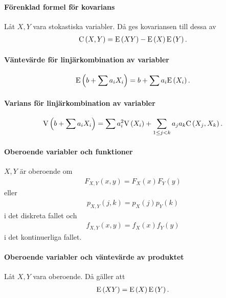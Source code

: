 \proof

\paragraph{Förenklad formel för kovarians}
Låt $X, Y$ vara stokastiska variabler. Då ges kovariansen till dessa av
\begin{align*}
	\text{C}\left(X, Y\right) = \text{E}\left(XY\right) - \text{E}\left(X\right)\text{E}\left(Y\right).
\end{align*}

\proof

\paragraph{Väntevärde för linjärkombination av variabler}
\begin{align*}
	\text{E}\left(b + \sum a_iX_i\right) = b +\sum a_i\text{E}\left(X_i\right).
\end{align*}

\proof

\paragraph{Varians för linjärkombination av variabler}
\begin{align*}
	\text{V}\left(b + \sum a_iX_i\right) = \sum a_i^2\text{V}\left(X_i\right) + \sum\limits_{1\leq j < k}a_ja_k\text{C}\left(X_j, X_k\right).
\end{align*}

\proof

\paragraph{Oberoende variabler och funktioner}
$X, Y$ är oberoende om
\begin{align*}
	F_{X, Y}(x, y) = F_{X}(x)F_{Y}(y)
\end{align*}
eller
\begin{align*}
	p_{X, Y}(j, k) = p_{X}(j)p_{Y}(k)
\end{align*}
i det diskreta fallet och
\begin{align*}
	f_{X, Y}(x, y) = f_{X}(x)f_{Y}(y)
\end{align*}
i det kontinuerliga fallet.

\proof

\paragraph{Oberoende variabler och väntevärde av produktet}
Låt $X, Y$ vara oberoende. Då gäller att
\begin{align*}
	\text{E}\left(XY\right) = \text{E}\left(X\right)\text{E}\left(Y\right).
\end{align*}

